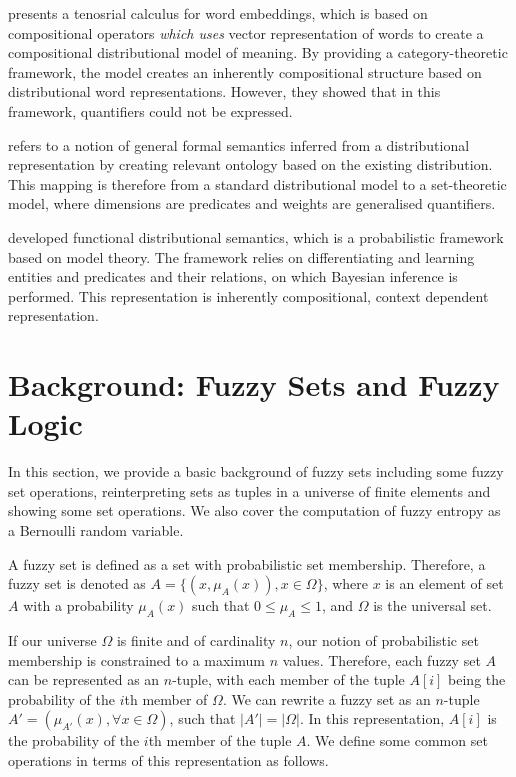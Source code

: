 \documentclass[11pt]{book}
\newcommand{\card}[1]{\left| #1 \right|}
\newcommand{\citet}[1]{\cite{#1}}
\begin{document}
\citet{grefenstette2013towards} presents a tenosrial calculus for word
embeddings, which is based on compositional operators \emph{which uses} vector
representation of words to create a compositional distributional model of
meaning. By providing a category-theoretic framework, the model creates an
inherently compositional structure based on distributional word
representations. However, they showed that in this framework, quantifiers could
not be expressed.

\citet{herbelot2015building} refers to a notion of general formal semantics
inferred from a distributional representation by creating relevant ontology
based on the existing distribution. This mapping is therefore from a standard
distributional model to a set-theoretic model, where dimensions are predicates
and weights are generalised quantifiers.

\citet{emerson2016functional, emerson2017semantic} developed functional
distributional semantics, which is a probabilistic framework based on model
theory. The framework relies on differentiating and learning entities and
predicates and their relations, on which Bayesian inference is performed. This
representation is inherently compositional, context dependent representation.

\section{Background: Fuzzy Sets and Fuzzy Logic} \label{sec: math}

In this section, we provide a basic background of fuzzy sets including some
fuzzy set operations, reinterpreting sets as tuples in a universe of finite
elements and showing some set operations. We also cover the computation of
fuzzy entropy as a Bernoulli random variable.

A fuzzy set is defined as a set with probabilistic set membership. Therefore, a
fuzzy set is denoted as $A = \{ (x, \mu_A(x)), x \in \Omega\}$,  where $x$ is
an element of set $A$ with a probability $\mu_A(x)$ such that $0 \leq \mu_A
\leq 1$, and $\Omega$ is the universal set.

If our universe $\Omega$ is finite and of cardinality $n$, our notion of
probabilistic set membership is constrained to a maximum $n$ values. Therefore,
each fuzzy set $A$ can be represented as an $n$-tuple, with each member of the
tuple $A[i]$ being the probability of the $i$th member of $\Omega$. We can
rewrite a fuzzy set as an $n$-tuple $A' = ( \mu_{A'}(x), \forall x \in \Omega
)$, such that $\card{A'} = \card \Omega$. In this representation, $A[i]$ is the
probability of the $i$th member of the tuple $A$. We define some common set
operations in terms of this representation as follows.
\end{document}
